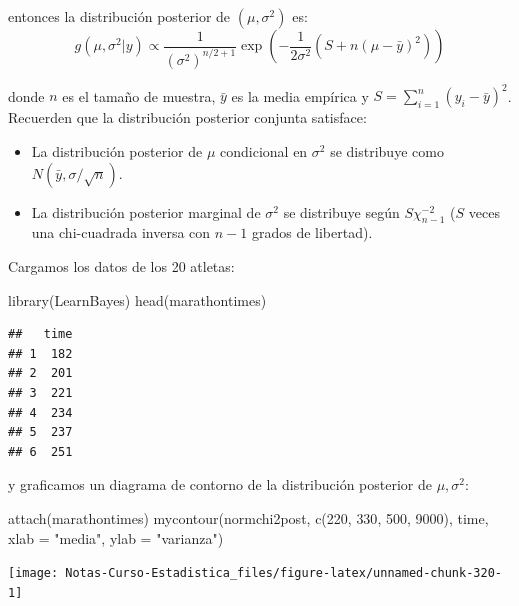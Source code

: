 \documentclass[
  12pt,
]{book}
\newenvironment{Shaded}{\begin{snugshade}}{\end{snugshade}}
\newcommand{\AttributeTok}[1]{\textcolor[rgb]{0.77,0.63,0.00}{#1}}
\newcommand{\DecValTok}[1]{\textcolor[rgb]{0.00,0.00,0.81}{#1}}
\newcommand{\FunctionTok}[1]{\textcolor[rgb]{0.00,0.00,0.00}{#1}}
\newcommand{\NormalTok}[1]{#1}
\newcommand{\StringTok}[1]{\textcolor[rgb]{0.31,0.60,0.02}{#1}}
\providecommand{\tightlist}{%
  \setlength{\itemsep}{0pt}\setlength{\parskip}{0pt}}
\theoremstyle{definition}
\theoremstyle{definition}
\theoremstyle{definition}
\theoremstyle{definition}
\theoremstyle{remark}
\begin{document}
entonces la distribución posterior de \((\mu,\sigma^2)\) es:
\[g(\mu,\sigma^2|y)\propto \frac{1}{(\sigma^2)^{n/2+1}}\exp{\left(-\frac{1}{2\sigma^2}\left(S+n(\mu-\bar y)^2\right)\right)}\]

donde \(n\) es el tamaño de muestra, \(\bar y\) es la media empírica y \(S=\sum_{i=1}^n(y_i-\bar y)^2\). Recuerden que la distribución posterior conjunta satisface:

\begin{itemize}
\tightlist
\item
  La distribución posterior de \(\mu\) condicional en \(\sigma^2\) se distribuye como \(N(\bar y,\sigma/\sqrt{n})\).
\item
  La distribución posterior marginal de \(\sigma^2\) se distribuye según \(S\chi_{n-1}^{-2}\) (\(S\) veces una chi-cuadrada inversa con \(n-1\) grados de libertad).
\end{itemize}

Cargamos los datos de los 20 atletas:

\begin{Shaded}
\begin{Highlighting}[]
\FunctionTok{library}\NormalTok{(LearnBayes)}
\FunctionTok{head}\NormalTok{(marathontimes)}
\end{Highlighting}
\end{Shaded}

\begin{verbatim}
##   time
## 1  182
## 2  201
## 3  221
## 4  234
## 5  237
## 6  251
\end{verbatim}

y graficamos un diagrama de contorno de la distribución posterior de \(\mu,\sigma^2\):

\begin{Shaded}
\begin{Highlighting}[]
\FunctionTok{attach}\NormalTok{(marathontimes)}
\FunctionTok{mycontour}\NormalTok{(normchi2post, }\FunctionTok{c}\NormalTok{(}\DecValTok{220}\NormalTok{, }\DecValTok{330}\NormalTok{, }\DecValTok{500}\NormalTok{, }\DecValTok{9000}\NormalTok{), time,}
    \AttributeTok{xlab =} \StringTok{"media"}\NormalTok{, }\AttributeTok{ylab =} \StringTok{"varianza"}\NormalTok{)}
\end{Highlighting}
\end{Shaded}

\begin{center}\texttt{[image: Notas-Curso-Estadistica\_files/figure-latex/unnamed-chunk-320-1]} \end{center}
\end{document}
